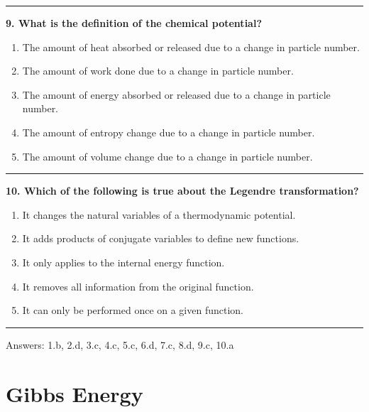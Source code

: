 \documentclass[
  9pt,
]{extbook}
\providecommand{\tightlist}{%
  \setlength{\itemsep}{0pt}\setlength{\parskip}{0pt}}
\theoremstyle{definition}
\theoremstyle{definition}
\theoremstyle{definition}
\theoremstyle{definition}
\theoremstyle{remark}
\begin{document}
\begin{center}\rule{0.5\linewidth}{0.5pt}\end{center}

\textbf{9. What is the definition of the chemical potential?}

\begin{enumerate}
\def\labelenumi{\alph{enumi}.}
\tightlist
\item
  The amount of heat absorbed or released due to a change in particle number.
\item
  The amount of work done due to a change in particle number.
\item
  The amount of energy absorbed or released due to a change in particle number.
\item
  The amount of entropy change due to a change in particle number.
\item
  The amount of volume change due to a change in particle number.
\end{enumerate}

\begin{center}\rule{0.5\linewidth}{0.5pt}\end{center}

\textbf{10. Which of the following is true about the Legendre transformation?}

\begin{enumerate}
\def\labelenumi{\alph{enumi}.}
\tightlist
\item
  It changes the natural variables of a thermodynamic potential.
\item
  It adds products of conjugate variables to define new functions.
\item
  It only applies to the internal energy function.
\item
  It removes all information from the original function.
\item
  It can only be performed once on a given function.
\end{enumerate}

\begin{center}\rule{0.5\linewidth}{0.5pt}\end{center}

Answers: 1.b, 2.d, 3.c, 4.c, 5.c, 6.d, 7.c, 8.d, 9.c, 10.a

\renewcommand*{\standardstate}{{-\kern-6pt{\ominus}\kern-6pt-}}

\chapter{Gibbs Energy}\label{GibbsFree}
\end{document}
